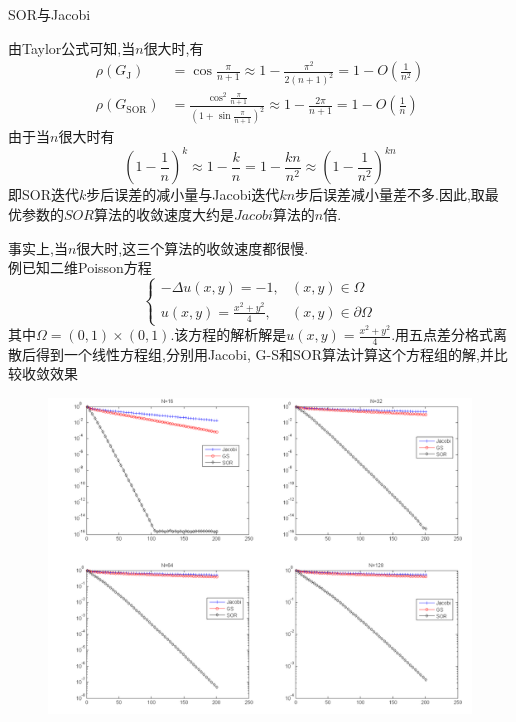 \documentclass[notheorems,serif]{beamer}
\renewcommand{\normalsize}{\wuhao}
\newcommand{\wuhao}{\fontsize{10.5pt}{\baselineskip}\selectfont}
\begin{document}
\begin{frame}


{\color{blue}\Large SOR与Jacobi}

\quad

\normalsize
由Taylor公式可知,当$n$很大时,有
$$
\begin{aligned} \rho\left(G_{\mathrm{J}}\right) &=\cos \frac{\pi}{n+1} \approx 1-\frac{\pi^{2}}{2(n+1)^{2}}=1-O\left(\frac{1}{n^{2}}\right) \\ \rho\left(G_{\mathrm{SOR}}\right) &=\frac{\cos ^{2} \frac{\pi}{n+1}}{\left(1+\sin \frac{\pi}{n+1}\right)^{2}} \approx 1-\frac{2 \pi}{n+1}=1-O\left(\frac{1}{n}\right) \end{aligned}
$$
由于当$n$很大时有
$$
\left(1-\frac{1}{n}\right)^{k} \approx 1-\frac{k}{n}=1-\frac{k n}{n^{2}} \approx\left(1-\frac{1}{n^{2}}\right)^{k n}
$$
即SOR迭代$k$步后误差的减小量与Jacobi迭代$kn$步后误差减小量差不多.因此,取最优参数的$SOR$算法的收敛速度大约是$Jacobi$算法的$n$倍.\\
\end{frame}

\begin{frame}
事实上,当$n$很大时,这三个算法的收敛速度都很慢.\\
{\color{blue}例}\quad 已知二维Poisson方程
$$
\left\{\begin{array}{ll}
{-\Delta u(x, y)=-1,} & {(x, y) \in \Omega} \\ 
{u(x, y)=\frac{x^{2}+y^{2}}{4},} & {(x, y) \in \partial \Omega}\end{array}\right.
$$
其中$\Omega=(0,1) \times(0,1)$.该方程的解析解是$u(x, y)=\frac{x^{2}+y^{2}}{4}$.用五点差分格式离散后得到一个线性方程组,分别用Jacobi, G-S和SOR算法计算这个方程组的解,并比较收敛效果
\end{frame}

\begin{figure}[h]
\centering 
\includegraphics[width=1\textwidth]{figurest/figure_3.png} 
\end{figure}
\end{document}
